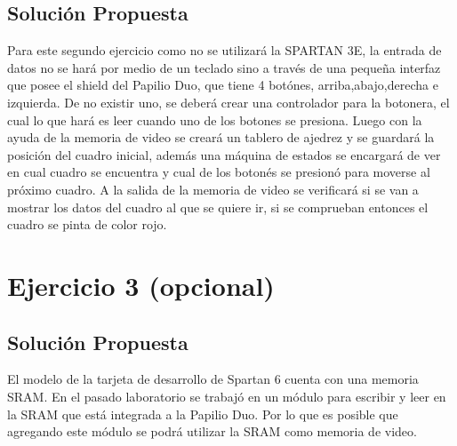 \documentclass[10pt]{article}
\begin{document}
\subsection*{Solución Propuesta}
Para este segundo ejercicio como no se utilizará la SPARTAN 3E, la entrada de datos no se hará por medio de un teclado sino a través de una pequeña interfaz que posee el shield del Papilio Duo, que tiene 4 botónes, arriba,abajo,derecha e izquierda.
De no existir uno, se deberá crear una controlador para la botonera, el cual lo que hará es leer cuando uno de los botones se presiona.
Luego con la ayuda de la memoria de video se creará un tablero de ajedrez y se guardará la posición del cuadro inicial, además una máquina de estados se encargará de ver en cual cuadro se encuentra y cual de los botonés se presionó para moverse al próximo cuadro. A la salida de la memoria de video se verificará si se van a mostrar los datos del cuadro al que se quiere ir, si se comprueban entonces el cuadro se pinta de color rojo.

\section*{Ejercicio 3 (opcional)}
\subsection*{Solución Propuesta}
El modelo de la tarjeta de desarrollo de Spartan 6 cuenta con una memoria SRAM. En el pasado laboratorio se trabajó en un módulo para escribir y leer en la SRAM que está integrada a la Papilio Duo. Por lo que es posible que agregando este módulo se podrá utilizar la SRAM como memoria de video.
\end{document}
